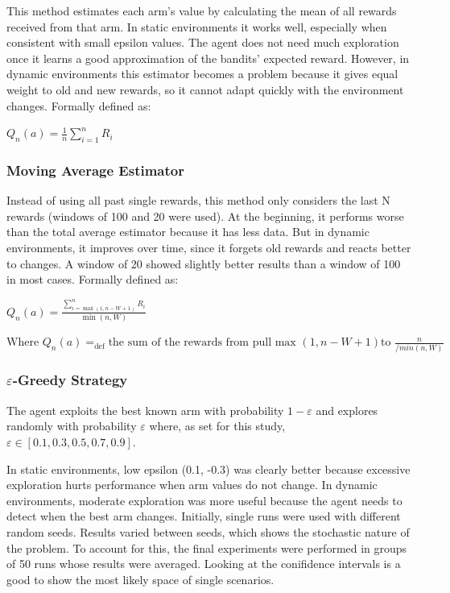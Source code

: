 \documentclass[11pt]{article}
\begin{document}
This method estimates each arm's value by calculating the mean of all rewards received from that arm.
In static environments it works well, especially when consistent with small epsilon values. The agent does not need much exploration once it learns a good approximation of the bandits' expected reward. However, in dynamic environments this estimator becomes a problem because it gives equal weight to old and new rewards, so it cannot adapt quickly with the environment changes. Formally defined as:

\bigskip

\begin{center}

  $Q_n(a) = \frac{1}{n} \sum_{i=1}^{n} R_i$
  
\end{center}

\subsubsection*{Moving Average Estimator}

Instead of using all past single rewards, this method only considers the last N rewards (windows of 100 and 20 were used).
At the beginning, it performs worse than the total average estimator because it has less data. But in dynamic environments, it improves over time, since it forgets old rewards and reacts better to changes. A window of 20 showed slightly better results than a window of 100 in most cases. Formally defined as:

\bigskip

\begin{center}
$  Q_n(a) = \frac{\sum_{i=\max(1, n-W+1)}^{n} R_i}{\min(n, W)}$ 

\bigskip

$\text{Where } Q_n(a) =_{\text{def}} \text{the sum of the rewards from pull max } (1, n-W+1) \text{to } \frac{n}{/min(n, W)}$
\end{center}

\subsubsection*{$\varepsilon $-Greedy Strategy}

The agent exploits the best known arm with probability $1-\varepsilon $ and explores randomly with probability $\varepsilon $ where, as set for this study, $\varepsilon \in [0.1, 0.3, 0.5, 0.7, 0.9]$.

In static environments, low epsilon (0.1, -0.3) was clearly better because excessive exploration hurts performance when arm values do not change. In dynamic environments, moderate exploration was more useful because the agent needs to detect when the best arm changes. Initially, single runs were used with different random seeds. Results varied between seeds, which shows the stochastic nature of the problem. To account for this, the final experiments were performed in groups of 50 runs whose results were averaged. Looking at the conifidence intervals is a good to show the most likely space of single scenarios.
\end{document}
